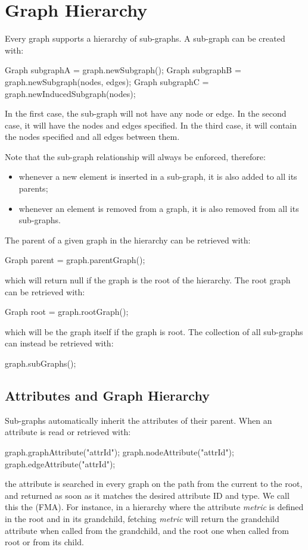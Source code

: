 \section{Graph Hierarchy}
Every graph supports a hierarchy of sub-graphs. A sub-graph can be created with:
\begin{java}
Graph subgraphA = graph.newSubgraph(); 
Graph subgraphB = graph.newSubgraph(nodes, edges); 
Graph subgraphC = graph.newInducedSubgraph(nodes); 
\end{java}
In the first case, the sub-graph will not have any node or edge. In the second case, it will have the nodes and edges specified. In the third case, it will contain the nodes specified and all edges between them.

Note that the sub-graph relationship will always be enforced, therefore:
\begin{itemize}
 \item whenever a new element is inserted in a sub-graph, it is also added to all its parents;
 \item whenever an element is removed from a graph, it is also removed from all its sub-graphs.
\end{itemize}

The parent of a given graph in the hierarchy can be retrieved with:
\begin{java}
Graph parent = graph.parentGraph();
\end{java}
which will return null if the graph is the root of the hierarchy. The root graph can be retrieved with:
\begin{java}
Graph root = graph.rootGraph();
\end{java}
which will be the graph itself if the graph is root. The collection of all sub-graphs can instead be retrieved with:
\begin{java}
graph.subGraphs();
\end{java}


\subsection{Attributes and Graph Hierarchy}
Sub-graphs automatically inherit the attributes of their parent. When an attribute is read or retrieved with:
\begin{java}
graph.graphAttribute("attrId");
graph.nodeAttribute("attrId");
graph.edgeAttribute("attrId"); 
\end{java}
the attribute is searched in every graph on the path from the current to the root, and returned as soon as it matches the desired attribute ID and type. We call this the  (FMA). For instance, in a hierarchy where the attribute \emph{metric} is defined in the root and in its grandchild, fetching \emph{metric} will return the grandchild attribute when called from the grandchild, and the root one when called from root or from its child.

